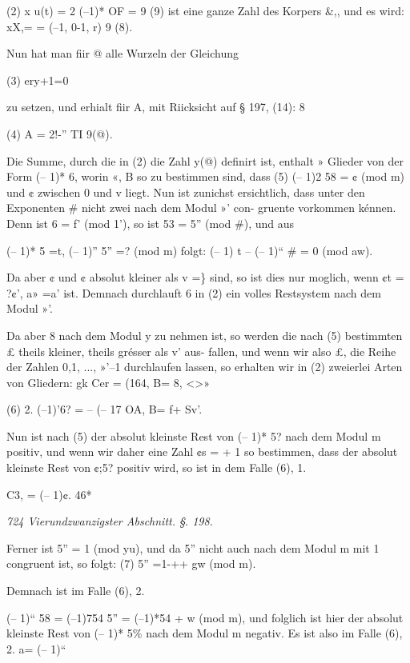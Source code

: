 \documentclass[12pt,a4paper]{article}
\theoremstyle{plain}
\theoremstyle{definition}
\begin{document}
(2) x u(t) = 2 (--1)* OF = 9 (9) ist eine ganze Zahl des Korpers \&,, und es wird: xX,= = (--1, 0-1, r) 9 (8).

Nun hat man fiir @ alle Wurzeln der Gleichung

(3) ery+1=0

zu setzen, und erhialt fiir A, mit Riicksicht auf § 197, (14): 8

(4) A = 2!-'' TI 9(@).

Die Summe, durch die in (2) die Zahl y(@) definirt ist, enthalt » Glieder von der Form (-- 1)* 6, worin «, B so zu bestimmen sind, dass (5) (-- 1)2 58 = ¢ (mod m) und ¢ zwischen 0 und v liegt. Nun ist zunichst ersichtlich, dass unter den Exponenten \# nicht zwei nach dem Modul »' con- gruente vorkommen kénnen. Denn ist 6 = f' (mod 1'), so ist 53 = 5'' (mod \#), und aus

(-- 1)* 5 =t, (-- 1)'' 5'' =? (mod m) folgt: (-- 1) t -- (-- 1)`` \# = 0 (mod aw).

Da aber ¢ und ¢ absolut kleiner als v =\} sind, so ist dies nur moglich, wenn ¢t = ?¢', a» =a' ist. Demnach durchlauft 6 in (2) ein volles Restsystem nach dem Modul »'.

Da aber 8 nach dem Modul y zu nehmen ist, so werden die nach (5) bestimmten £ theils kleiner, theils grésser als v' aus- fallen, und wenn wir also £, die Reihe der Zahlen 0,1, ..., »'--1 durchlaufen lassen, so erhalten wir in (2) zweierlei Arten von Gliedern: gk Cer = (164, B= 8, <>»

(6) 2. (--1)'6? = -- (-- 17 OA, B= f+ Sv'.

Nun ist nach (5) der absolut kleinste Rest von (-- 1)* 5? nach dem Modul m positiv, und wenn wir daher eine Zahl ¢s = + 1 so bestimmen, dass der absolut kleinste Rest von ¢;5? positiv wird, so ist in dem Falle (6), 1.

C3, = (-- 1)¢. 46*

\vspace{0.5\baselineskip}\noindent\textit{724 Vierundzwanzigster Abschnitt. §. 198.}\par

Ferner ist 5'' = 1 (mod yu), und da 5'' nicht auch nach dem Modul m mit 1 congruent ist, so folgt: (7) 5'' =1-++ gw (mod m).

Demnach ist im Falle (6), 2.

(-- 1)`` 58 = (--1)754 5'' = (--1)*54 + w (mod m), und folglich ist hier der absolut kleinste Rest von (-- 1)* 5\% nach dem Modul m negativ. Es ist also im Falle (6), 2. a= (-- 1)``
\end{document}
